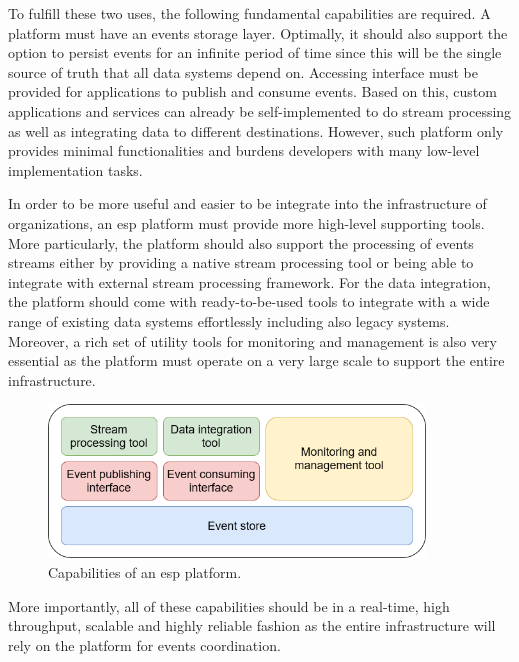 To fulfill these two uses, the following fundamental capabilities are required. A platform must have an events storage layer. Optimally, it should also support the option to persist events for an infinite period of time since this will be the single source of truth that all data systems depend on. Accessing interface must be provided for applications to publish and consume events. Based on this, custom applications and services can already be self-implemented to do stream processing as well as integrating data to different destinations. However, such platform only provides minimal functionalities and burdens developers with many low-level implementation tasks.

In order to be more useful and easier to be integrate into the infrastructure of organizations, an \acrshort{esp} platform must provide more high-level supporting tools. More particularly, the platform should also support the processing of events streams either by providing a native stream processing tool or being able to integrate with external stream processing framework. For the data integration, the platform should come with ready-to-be-used tools to integrate with a wide range of existing data systems effortlessly including also legacy systems. Moreover, a rich set of utility tools for monitoring and management is also very essential as the platform must operate on a very large scale to support the entire infrastructure.

\begin{figure}[h]
	\centering
	\includegraphics[width=10cm]{images/espplatform.png}
	\caption{Capabilities of an \acrshort{esp} platform.}
	\label{fig:espplatform}
\end{figure}


More importantly, all of these capabilities should be in a real-time, high throughput, scalable and highly reliable fashion as the entire infrastructure will rely on the platform for events coordination. 





